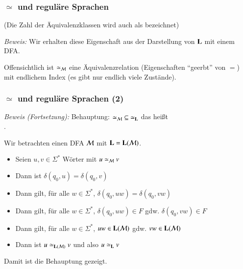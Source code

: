 \documentclass[onlymath]{beamer}
\begin{document}

\begin{frame}[t]\frametitle{$\simeq$ und reguläre Sprachen}

(Die Zahl der Äquivalenzklassen wird auch als  bezeichnet)\medskip\pause

\emph{Beweis:} Wir erhalten diese Eigenschaft aus der Darstellung von $\textbf{\textcolor{black}{L}}$ mit einem DFA.


Offensichtlich ist $\simeq_{\mathcal{M}}$ eine Äquivalenzrelation (Eigenschaften "`geerbt"' von $=$) mit endlichem Index (es gibt nur endlich viele Zustände).
\medskip


\end{frame}

\begin{frame}[t]\frametitle{$\simeq$ und reguläre Sprachen (2)}


\emph{Beweis (Fortsetzung):} 
Behauptung: ${\simeq_{\mathcal{M}}}\subseteq {\simeq_{\textbf{\textcolor{black}{L}}}}$ das heißt\\[1ex]
% 
.\medskip

Wir betrachten einen DFA $\mathcal{M}$ mit $\textbf{\textcolor{black}{L}}=\textbf{\textcolor{black}{L}}(\mathcal{M})$.\pause
\begin{itemize}
\item Seien $u,v\in\Sigma^*$ Wörter mit $u \simeq_{\mathcal{M}} v$\pause
\item Dann ist $\delta(q_0,u)=\delta(q_0,v)$\pause
\item Dann gilt, für alle $w\in\Sigma^*$, $\delta(q_0,uw)=\delta(q_0,vw)$\pause
\item Dann gilt, für alle $w\in\Sigma^*$, $\delta(q_0,uw)\in F$ gdw. $\delta(q_0,vw)\in F$\pause
\item Dann gilt, für alle $w\in\Sigma^*$, $uw\in \textbf{\textcolor{black}{L}}(\mathcal{M})$ gdw. $vw\in \textbf{\textcolor{black}{L}}(\mathcal{M})$\pause
\item Dann ist $u \simeq_{\textbf{\textcolor{black}{L}}(\mathcal{M})} v$ und also $u \simeq_{\textbf{\textcolor{black}{L}}} v$
\end{itemize}
Damit ist die Behauptung gezeigt.

\end{frame}
\end{document}
